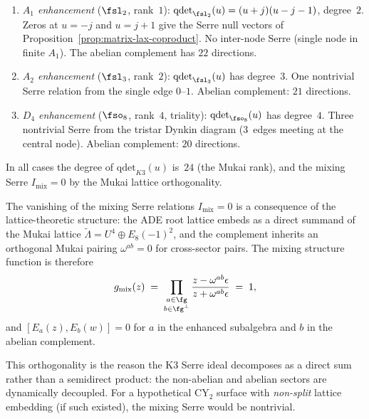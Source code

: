 \begin{remark}
\label{rem:k3-serre-examples}
\begin{enumerate}[label=\textup{(\alph*)}]
\item \emph{$A_1$ enhancement} ($\fsl_2$, rank~$1$):
 $\mathrm{qdet}_{\fsl_2}(u) = (u + j)(u - j - 1)$, degree~$2$.
 Zeros at $u = -j$ and $u = j + 1$ give the Serre null vectors
 of Proposition~\ref{prop:matrix-lax-coproduct}.
 No inter-node Serre (single node in finite $A_1$).
 The abelian complement has $22$ directions.

\item \emph{$A_2$ enhancement} ($\fsl_3$, rank~$2$):
 $\mathrm{qdet}_{\fsl_3}(u)$ has degree~$3$.
 One nontrivial Serre relation from the single edge $0$--$1$.
 Abelian complement: $21$ directions.

\item \emph{$D_4$ enhancement} ($\fso_8$, rank~$4$, triality):
 $\mathrm{qdet}_{\fso_8}(u)$ has degree~$4$.
 Three nontrivial Serre from the tristar Dynkin diagram
 ($3$~edges meeting at the central node).
 Abelian complement: $20$ directions.
\end{enumerate}
In all cases the degree of $\mathrm{qdet}_{K3}(u)$ is~$24$ (the Mukai rank),
and the mixing Serre $I_{\mathrm{mix}} = 0$ by the Mukai lattice
orthogonality.
\end{remark}

\begin{remark}
\label{rem:k3-serre-mixing-mechanism}
The vanishing of the mixing Serre relations $I_{\mathrm{mix}} = 0$
is a consequence of the lattice-theoretic structure:
the ADE root lattice embeds as a direct summand of the Mukai lattice
$\widetilde{\Lambda} = U^4 \oplus E_8(-1)^2$,
and the complement inherits an orthogonal Mukai pairing
$\omega^{ab} = 0$ for cross-sector pairs.
The mixing structure function is therefore
\[
 g_{\mathrm{mix}}(z) \;=\;
 \prod_{\substack{a \in \fg \\ b \in \fg^\perp}}
 \frac{z - \omega^{ab} \epsilon}{z + \omega^{ab} \epsilon}
 \;=\; 1,
\]
and $[E_a(z), E_b(w)] = 0$ for $a$ in the enhanced subalgebra and
$b$ in the abelian complement.

This orthogonality is the reason the K3 Serre ideal decomposes as
a direct sum rather than a semidirect product: the non-abelian and
abelian sectors are dynamically decoupled. For a hypothetical
CY$_2$ surface with \emph{non-split} lattice embedding (if such
existed), the mixing Serre would be nontrivial.
\end{remark}



